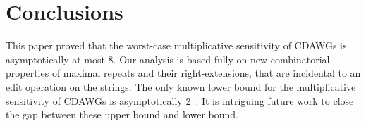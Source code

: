 \section{Conclusions}
This paper proved that the worst-case multiplicative sensitivity
of CDAWGs is asymptotically at most 8.
Our analysis is based fully on new combinatorial properties
of maximal repeats and their right-extensions,
that are incidental to an edit operation on the strings.
%
The only known lower bound for the multiplicative sensitivity of CDAWGs
is asymptotically 2~\cite{FujimaruNI25}.
It is intriguing future work to close the gap between
these upper bound and lower bound.
